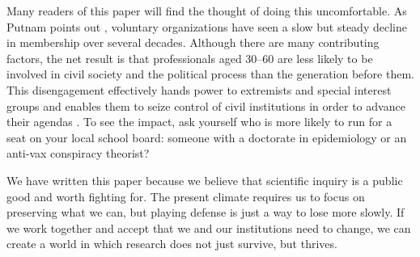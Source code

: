 \documentclass[10pt,letterpaper]{article}
\begin{document}
Many readers of this paper will find the thought of doing this uncomfortable.
As Putnam points out \cite{Putnam2020},
voluntary organizations have seen a slow but steady decline in membership over several decades.
Although there are many contributing factors,
the net result is that professionals aged 30--60
are less likely to be involved in civil society and the political process than the generation before them.
This disengagement effectively hands power to extremists and special interest groups
and enables them to seize control of civil institutions in order to advance their agendas \cite{BuenoDeMesquita2022}.
To see the impact,
ask yourself who is more likely to run for a seat on your local school board:
someone with a doctorate in epidemiology or an anti-vax conspiracy theorist?

We have written this paper because we believe that scientific inquiry is a public good and worth fighting for.
The present climate requires us to focus on preserving what we can,
but playing defense is just a way to lose more slowly.
If we work together and accept that we and our institutions need to change,
we can create a world in which research does not just survive,
but thrives.


\end{document}

